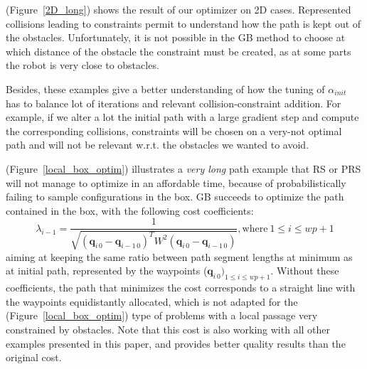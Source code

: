 \documentclass{tADR2e}
\newcommand\conf{\mathbf{q}}
\newcommand\weight{W}
\begin{document}
(Figure~\ref{2D_long}) shows the result of our optimizer on 2D cases. Represented collisions leading to constraints permit to understand how the path is kept out of the obstacles. Unfortunately, it is not possible in the GB method to choose at which distance of the obstacle the constraint must be created, as at some parts the robot is very close to obstacles.

Besides, these examples give a better understanding of how the tuning of 
$\alpha_{init}$ 
has to balance lot of iterations and relevant collision-constraint addition. For 
example, if we alter a lot the initial path with a large gradient step and 
compute the corresponding collisions, constraints will be chosen on a very-not 
optimal path and will not be relevant w.r.t. the obstacles we wanted to 
avoid.

(Figure~\ref{local_box_optim}) illustrates a \textit{very long} path example that RS 
or PRS will not manage to 
optimize in an affordable time, because of probabilistically failing to sample 
configurations in the box. GB succeeds to optimize the 
path contained in the box, with the following cost coefficients:
$$
\lambda_{i-1} = \frac{1}{\sqrt{(\conf_{i\,0}-\conf_{i-1\,0})^T \weight^2 
(\conf_{i\,0}-\conf_{i-1\,0})}}, \text{where} \  1\leq i\leq wp+1 
$$
aiming at keeping the same ratio between path segment lengths at 
minimum as at 
initial path, represented by the waypoints ($\conf_{i\,0})_{1\leq i\leq wp+1}$.
Without these coefficients, the path that minimizes the cost corresponds to a 
straight line with the waypoints equidistantly allocated, which is not adapted for 
the (Figure~\ref{local_box_optim}) type of problems with a local passage very
constrained by obstacles. Note that this cost is also working with all other 
examples presented in this paper, and provides better quality results than the original cost.
\end{document}
